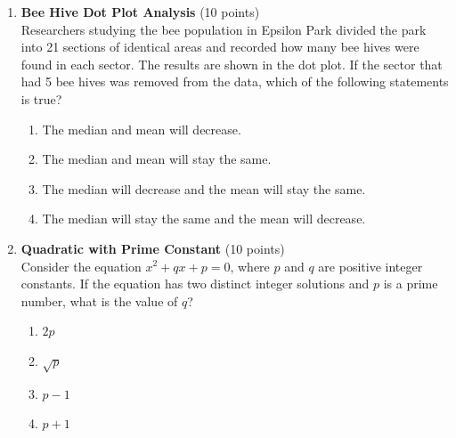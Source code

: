 \begin{enumerate}
  \newpage

  

  \item \textbf{Bee Hive Dot Plot Analysis} (10 points)\\
  Researchers studying the bee population in Epsilon Park divided the park into 21 sections of identical areas and recorded how many bee hives were found in each sector. The results are shown in the dot plot. If the sector that had 5 bee hives was removed from the data, which of the following statements is true?
  \begin{enumerate}[label=(\Alph*)]
    \item The median and mean will decrease.
    \item The median and mean will stay the same.
    \item The median will decrease and the mean will stay the same.
    \item The median will stay the same and the mean will decrease.
  \end{enumerate}
  \begin{subanswer}
  \end{subanswer}

  

  \item \textbf{Quadratic with Prime Constant} (10 points)\\
  Consider the equation $x^2 + qx + p = 0$, where $p$ and $q$ are positive integer constants. If the equation has two distinct integer solutions and $p$ is a prime number, what is the value of $q$?
  \begin{enumerate}[label=(\Alph*)]
    \item $2p$
    \item $\sqrt{p}$
    \item $p-1$
    \item $p+1$
  \end{enumerate}
  \begin{subanswer}
  \end{subanswer}


\end{enumerate}

